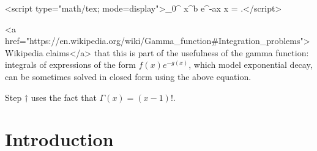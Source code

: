 \documentclass{article}
\begin{document}
<script type="math/tex; mode=display">\int_{0}^{\infty} x^{b} e^{-ax} x = .</script>

\noindent <a href="https://en.wikipedia.org/wiki/Gamma_function#Integration_problems">Wikipedia claims</a> that this is part of the usefulness of the gamma function: integrals of expressions of the form $f(x) e^{-g(x)}$, which model exponential decay, can be sometimes solved in closed form using the above equation.

\noindent Step $\dagger$ uses the fact that $\Gamma(x) = (x - 1)!$.




\section{Introduction}
\end{document}
